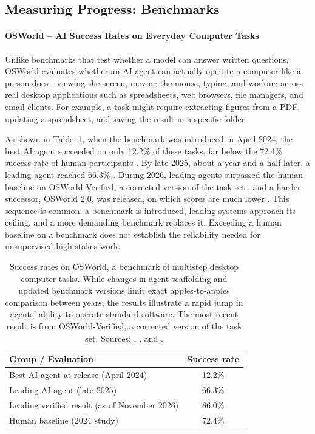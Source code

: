 \documentclass[11pt]{article}
\begin{document}
\subsection{Measuring Progress: Benchmarks}

\paragraph{OSWorld -- AI Success Rates on Everyday Computer Tasks}

Unlike benchmarks that test whether a model can answer written questions, OSWorld evaluates whether an AI agent can actually operate a computer like a person does---viewing the screen, moving the mouse, typing, and working across real desktop applications such as spreadsheets, web browsers, file managers, and email clients. For example, a task might require extracting figures from a PDF, updating a spreadsheet, and saving the result in a specific folder.

As shown in Table~\ref{tab:osworld}, when the benchmark was introduced in April 2024, the best AI agent succeeded on only 12.2\% of these tasks, far below the 72.4\% success rate of human participants
\citep{OSWorld2024}.
By late 2025, about a year and a half later, a leading agent reached 66.3\% \citep{StanfordHAI2026Index}.
During 2026, leading agents surpassed the human baseline on OSWorld-Verified, a corrected version of the task set \citep{XLANG2026OSWorldVerified},
and a harder successor, OSWorld 2.0, was released, on which scores are much lower \citep{Yuan2026OSWorld2}.
This sequence is common: a benchmark is introduced, leading systems approach its ceiling, and a more demanding benchmark replaces it. Exceeding a human baseline on a benchmark does not establish the reliability needed for unsupervised high-stakes work.

\begin{table}[!htbp]
\centering
\begingroup
{}
\begin{tabular}{lc}
\toprule
\textbf{Group / Evaluation} & \textbf{Success rate} \\
\midrule
Best AI agent at release (April 2024) & 12.2\% \\
Leading AI agent (late 2025) & 66.3\% \\
Leading verified result (as of November 2026) & 86.0\% \\
Human baseline (2024 study) & 72.4\% \\
\bottomrule
\end{tabular}
\endgroup
\caption{Success rates on OSWorld, a benchmark of multistep desktop computer tasks. While changes in agent scaffolding and updated benchmark versions limit exact apples-to-apples comparison between years, the results illustrate a rapid jump in agents' ability to operate standard software.
The most recent result is from OSWorld-Verified, a corrected version of the task set. Sources: \citet{OSWorld2024}, \citet{StanfordHAI2026Index}, and \citet{XLANG2026OSWorldVerified}.}
\label{tab:osworld}
\end{table}
\end{document}
